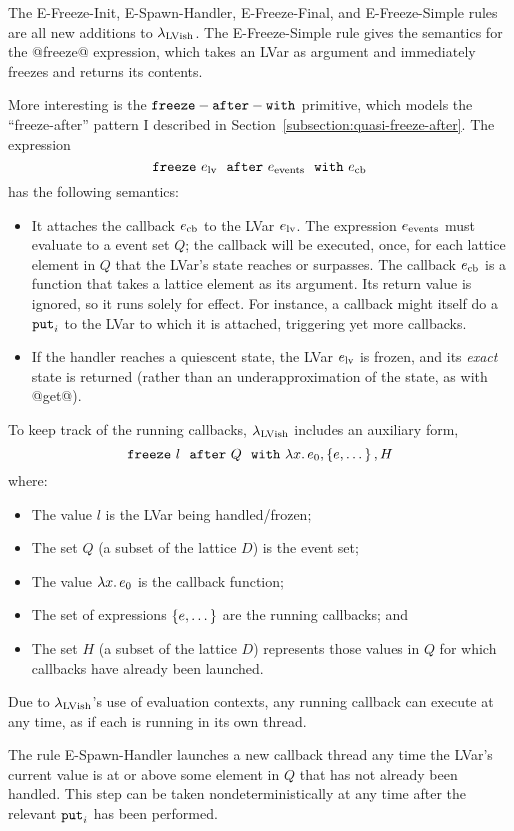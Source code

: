 The {\sc E-Freeze-Init}, {\sc E-Spawn-Handler}, {\sc E-Freeze-Final},
and {\sc E-Freeze-Simple} rules are all new additions to
$\lambda_{\textrm{LVish}}$.  The {\sc E-Freeze-Simple} rule gives the semantics
for the @freeze@ expression, which takes an LVar as argument and
immediately freezes and returns its contents.

More interesting is the ${\mbox{\texttt{freeze}}-\mbox{\texttt{after}}-\mbox{\texttt{with}}}$ primitive, which models the
``freeze-after'' pattern I described in
Section~\ref{subsection:quasi-freeze-after}.  The expression
\[ \mbox{\texttt{freeze}}~e_{\rm lv}~~{\mbox{\texttt{after}}}~e_{\rm events}~~{\mbox{\texttt{with}}}~e_{\rm cb} \]
has the following semantics:
\begin{itemize}
\item It attaches the callback $e_{\rm cb}$ to the LVar $e_{\rm lv}$.
  The expression $e_{\rm events}$ must evaluate to a event set $Q$;
  the callback will be executed, once, for each lattice element in $Q$
  that the LVar's state reaches or surpasses.  The callback $e_{\rm
    cb}$ is a function that takes a lattice element as its argument.
  Its return value is ignored, so it runs solely for effect.  For
  instance, a callback might itself do a $\mbox{\texttt{put}}_i$ to the LVar to which
  it is attached, triggering yet more callbacks.
\item If the handler reaches a quiescent state, the LVar $e_{\rm lv}$
  is frozen, and its \emph{exact} state is returned (rather than an
  underapproximation of the state, as with @get@).
\end{itemize}
To keep track of the running callbacks, $\lambda_{\textrm{LVish}}$ includes an
auxiliary form,
\[
\mbox{\texttt{freeze}}~l~~{\mbox{\texttt{after}}}~Q~~{\mbox{\texttt{with}}}~\lambda x.\,e_0, \left\{e, \dots\right\}, H
\]
where:
\begin{itemize}
\item The value $l$ is the LVar being handled/frozen;
\item The set $Q$ (a subset of the lattice $D$) is the event set;
\item The value $\lambda x.\,e_0$ is the callback function;
\item The set of expressions $\left\{e, \dots\right\}$ are the running
  callbacks; and
\item The set $H$ (a subset of the lattice $D$) represents those
  values in $Q$ for which callbacks have already been launched.
\end{itemize}
Due to $\lambda_{\textrm{LVish}}$'s use of evaluation contexts, any running
callback can execute at any time, as if each is running in its own
thread.

The rule {\sc E-Spawn-Handler} launches a new callback thread any time
the LVar's current value is at or above some element in $Q$ that has
not already been handled.  This step can be taken nondeterministically
at any time after the relevant $\mbox{\texttt{put}}_i$ has been performed.

